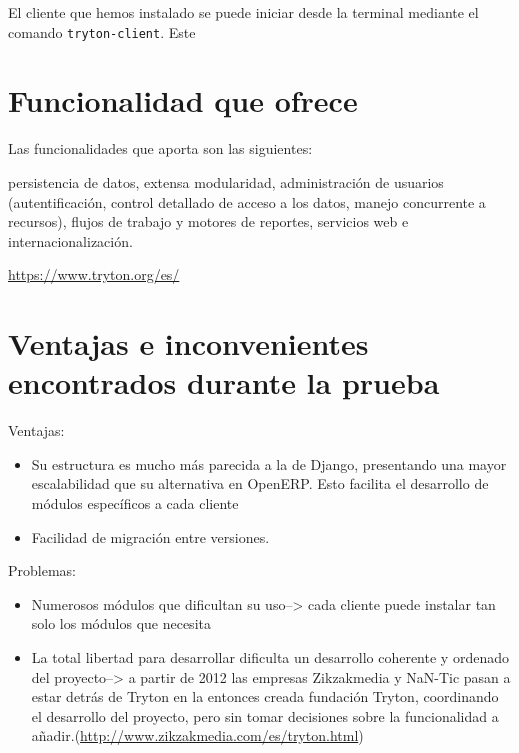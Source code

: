 \documentclass{article}
\begin{document}
El cliente que hemos instalado se puede iniciar desde la terminal mediante el comando \texttt{tryton-client}. Este



\section{Funcionalidad que ofrece}

Las funcionalidades que aporta son las siguientes:

persistencia de datos, extensa modularidad, administración de usuarios (autentificación, control detallado de acceso a los datos, manejo concurrente a recursos), flujos de trabajo y motores de reportes, servicios web e internacionalización.

\url{https://www.tryton.org/es/}


\section{Ventajas e inconvenientes encontrados durante la prueba}
Ventajas:
\begin{itemize}
    \item Su estructura es mucho más parecida a la de Django, presentando una mayor escalabilidad que su alternativa en OpenERP. Esto facilita el desarrollo de módulos específicos a cada cliente
    \item Facilidad de migración entre versiones.
\end{itemize}

Problemas:
\begin{itemize}
    \item Numerosos módulos que dificultan su uso--> cada cliente puede instalar tan solo los módulos que necesita
    \item La total libertad para desarrollar dificulta un desarrollo coherente y ordenado del proyecto--> a partir de 2012 las empresas Zikzakmedia y NaN-Tic pasan a estar detrás de Tryton en la entonces creada fundación Tryton, coordinando el desarrollo del proyecto, pero sin tomar decisiones sobre la funcionalidad a añadir.(\url{http://www.zikzakmedia.com/es/tryton.html})
\end{itemize}
\end{document}
